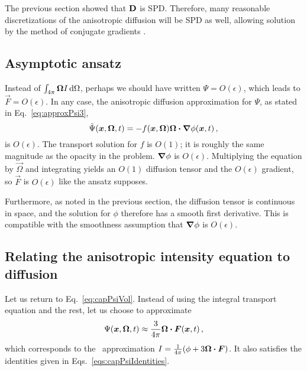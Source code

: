 The previous section showed that $\mathbf{D}$ is SPD. Therefore, many reasonable
discretizations of the anisotropic diffusion will be SPD as well, allowing
solution by the method of conjugate gradients \cite{Tre1997}.

\subsection{Asymptotic ansatz}
Instead of $\int_{4\pi} \bm{\Omega} I\mathop{}\!\mathrm{d}\Omega$, perhaps we should have written
$\Psi=O(\epsilon)$, which leads to $\vec{F}=O(\epsilon)$. In any case, the
anisotropic diffusion approximation for $\Psi$, as stated in
Eq.~\eqref{eq:approxPsi3},
\begin{equation*}
\tilde\Psi(\bm{x}, \bm{\Omega}, t) = - f(\bm{x}, \bm{\Omega})
\bm{\Omega}\bm{\cdot} \bm{\nabla} \phi(\bm{x}, t)\,,
\end{equation*}
is $O(\epsilon)$. The transport solution for $f$ is $O(1)$; it is roughly the
same magnitude as the opacity in the problem. $\bm{\nabla} \phi$ is $O(\epsilon)$.
Multiplying the equation by $\vec{\Omega}$ and integrating yields an $O(1)$
diffusion tensor and the $O(\epsilon)$ gradient, so $\vec{F}$ is $O(\epsilon)$
like the ansatz supposes.

Furthermore, as noted in the previous section, the diffusion tensor is
continuous in space, and the solution for $\phi$ therefore has a smooth first
derivative. This is compatible with the smoothness assumption that $\bm{\nabla} \phi$
is $O(\epsilon)$.

\subsection{Relating the anisotropic intensity equation to
diffusion}\label{sec:adDiscDiff}
Let us return to Eq.~\eqref{eq:capPsiVol}. Instead of using the integral
transport equation and the rest, let us choose to approximate
\begin{equation*}
  \Psi(\bm{x}, \bm{\Omega}, t) \approx \frac{3}{4\pi} \bm{\Omega} \bm{\cdot}
  \bm{F}(\bm{x}, t)\,,
\end{equation*}
which corresponds to the \Pone\ approximation $I= \frac{1}{4\pi} (\phi +
3\bm{\Omega} \bm{\cdot} \bm{F})$. It also satisfies the identities given in
Eqs.~\eqref{eqs:capPsiIdentities}.

